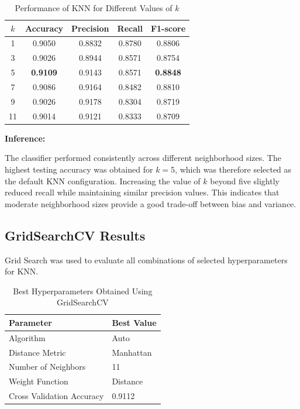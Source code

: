 \documentclass[12pt,a4paper]{article}
\begin{document}
	\begin{table}[H]
		\centering
		\caption{Performance of KNN for Different Values of $k$}
		\begin{tabular}{ccccc}
			\toprule
			$k$ & Accuracy & Precision & Recall & F1-score\\
			\midrule
			1 & 0.9050 & 0.8832 & 0.8780 & 0.8806\\
			3 & 0.9026 & 0.8944 & 0.8571 & 0.8754\\
			5 & \textbf{0.9109} & 0.9143 & 0.8571 & \textbf{0.8848}\\
			7 & 0.9086 & 0.9164 & 0.8482 & 0.8810\\
			9 & 0.9026 & 0.9178 & 0.8304 & 0.8719\\
			11 & 0.9014 & 0.9121 & 0.8333 & 0.8709\\
			\bottomrule
		\end{tabular}
	\end{table}
	
	\textbf{Inference:}
	
	The classifier performed consistently across different neighborhood sizes. The highest testing accuracy was obtained for $k=5$, which was therefore selected as the default KNN configuration. Increasing the value of $k$ beyond five slightly reduced recall while maintaining similar precision values. This indicates that moderate neighborhood sizes provide a good trade-off between bias and variance.
	
	\subsection{GridSearchCV Results}
	
	Grid Search was used to evaluate all combinations of selected hyperparameters for KNN.
	
	\begin{table}[H]
		\centering
		\caption{Best Hyperparameters Obtained Using GridSearchCV}
		\begin{tabular}{ll}
			\toprule
			Parameter & Best Value\\
			\midrule
			Algorithm & Auto\\
			Distance Metric & Manhattan\\
			Number of Neighbors & 11\\
			Weight Function & Distance\\
			Cross Validation Accuracy & 0.9112\\
			\bottomrule
		\end{tabular}
	\end{table}
	
\end{document}
